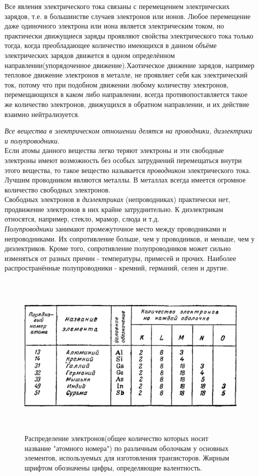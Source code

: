 	\par Все явления электрического тока связаны с перемещением электрических зарядов, т.е. в большинстве случаев электронов или ионов. Любое перемещение даже одиночного электрона или иона является электрическим током, но практически движущиеся заряды проявляют свойства электрического тока только тогда, когда преобладающее количество имеющихся в данном объёме электрических зарядов движется в одном определённом направлении(упорядоченное движение).Хаотическое движение зарядов, например тепловое движение электронов в металле, не проявляет себя как электрический ток, потому что при подобном движении любому количеству электронов, перемещающихся в каком либо направлении, всегда противопоставляется такое же количество электронов, движущихся в обратном направлении, и их действие взаимно нейтрализуется.
	
	\par \textit{Все вещества в электрическом отношении делятся на проводники, диэлектрики и полупроводники}.
	\\
	Если атомы данного вещества легко теряют электроны и эти свободные электроны имеют возможность без особых затруднений перемещаться внутри этого вещества, то такое вещество называется \textit{проводником} электрического тока. Лучшим проводником являются металлы. В металлах всегда имеется огромное количество свободных электронов.
	\\
	Свободных электронов в \textit{диэлектриках} (непроводниках) практически нет, продвижение электронов в них крайне затруднительно. К диэлектрикам относятся, например, стекло, мрамор, слюда и т.д. 
	\\
	\textit{Полупроводники} занимают промежуточное место между проводниками и непроводниками. Их сопротивление больше, чем у проводников, и меньше, чем у диэлектриков. Кроме того, сопротивление полупроводников может сильно изменяться от разных причин - температуры, примесей и прочих. Наиболее распространённые полупроводники - кремний, германий, селен и другие.
	
	\begin{figure}[h]
		\centering
		\includegraphics[height=8cm]{img/3} 
		\captionsetup{font=footnotesize}
		\caption{Распределение электронов(общее количество которых носит название "атомного номера") по различным оболочкам у основных элементов, используемых для изготовления транзисторов. Жирным шрифтом обозначены цифры, определяющие валентность.} 
	\end{figure}
	
